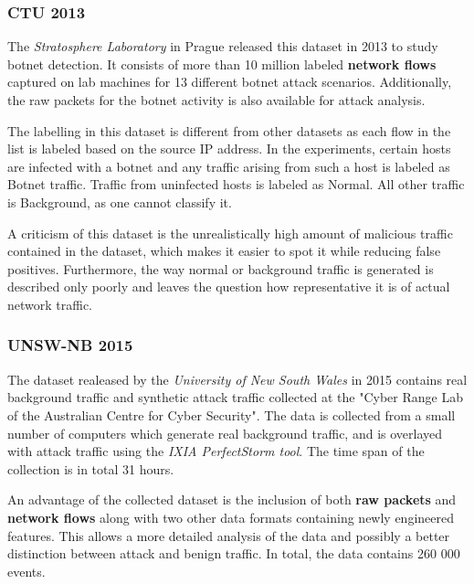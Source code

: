 \subsubsection*{CTU 2013 \cite{noauthor_ctu-13_nodate, garcia2014empirical}}

The \textit{Stratosphere Laboratory} in Prague released this dataset in 2013 to study botnet detection. It consists of more than 10 million labeled \textbf{network flows} captured on lab machines for 13 different botnet attack scenarios. Additionally, the raw packets for the botnet activity is also available for attack analysis. 

The labelling in this dataset is different from other datasets as each  flow  in  the  list  is  labeled  based  on  the  source  IP  address.  In  the experiments,  certain  hosts  are  infected  with  a  botnet  and  any  traffic  arising from such a host is labeled as Botnet traffic. Traffic from uninfected hosts is labeled as Normal. All other traffic is Background, as one cannot classify it. 

A criticism of this dataset is the unrealistically high amount of malicious traffic contained in the dataset, which makes it easier to spot it while reducing false positives. Furthermore, the way normal or background traffic is generated is described only poorly and leaves the question how representative it is of actual network traffic.

\subsubsection*{UNSW-NB 2015 \cite{moustafa_unsw-nb15:_2015}}

The dataset realeased by the \textit{University of New South Wales} in 2015 contains real background traffic and synthetic attack traffic collected at the "Cyber Range Lab of the Australian Centre for Cyber Security". The data is collected from a small number of computers which generate real background traffic, and is overlayed with attack traffic using the \textit{IXIA PerfectStorm tool}. The time span of the collection is in total 31 hours.

An advantage of the collected dataset is the inclusion of both \textbf{raw packets} and \textbf{network flows} along with two other data formats containing newly engineered features. This allows a more detailed analysis of the data and possibly a better distinction between attack and benign traffic. In total, the data contains 260 000 events.

